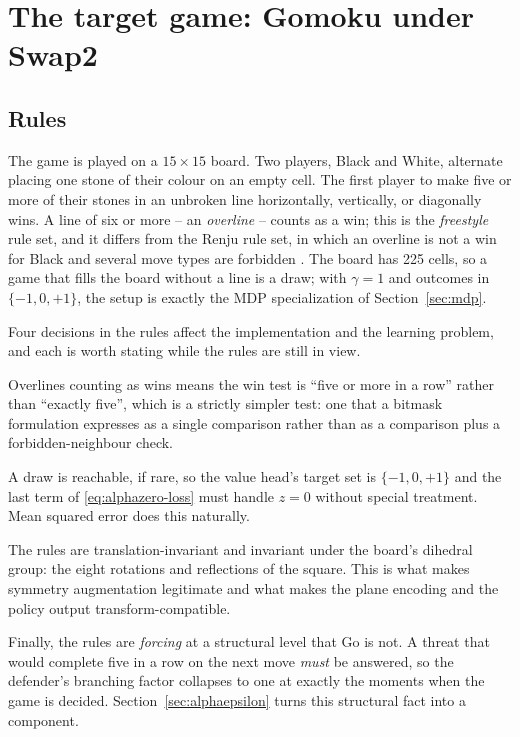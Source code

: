 \section{The target game: Gomoku under Swap2}
\label{sec:gomoku}

\subsection{Rules}
\label{sec:rules}

The game is played on a $15\times15$ board. Two players, Black and White,
alternate placing one stone of their colour on an empty cell. The first player to
make five or more of their stones in an unbroken line horizontally, vertically,
or diagonally wins. A line of six or more -- an \emph{overline} -- counts as a
win; this is the \emph{freestyle} rule set, and it differs from the Renju rule
set, in which an overline is not a win for Black and several move types are
forbidden \citep{renju_rules}. The board has 225 cells, so a game that fills the
board without a line is a draw; with $\gamma = 1$ and outcomes in $\{-1, 0, +1\}$,
the setup is exactly the MDP specialization of Section~\ref{sec:mdp}.

Four decisions in the rules affect the implementation and the learning problem,
and each is worth stating while the rules are still in view.

Overlines counting as wins means the win test is ``five or more in a row'' rather
than ``exactly five'', which is a strictly simpler test: one that a bitmask
formulation expresses as a single comparison rather than as a comparison plus a
forbidden-neighbour check.

A draw is reachable, if rare, so the value head's target set is $\{-1,0,+1\}$ and
the last term of \eqref{eq:alphazero-loss} must handle $z = 0$ without special
treatment. Mean squared error does this naturally.

The rules are translation-invariant and invariant under the board's dihedral
group: the eight rotations and reflections of the square. This is what makes
symmetry augmentation legitimate and what makes the plane encoding and the policy
output transform-compatible.

Finally, the rules are \emph{forcing} at a structural level that Go is not. A
threat that would complete five in a row on the next move \emph{must} be answered,
so the defender's branching factor collapses to one at exactly the moments when
the game is decided. Section~\ref{sec:alphaepsilon} turns this structural fact
into a component.


